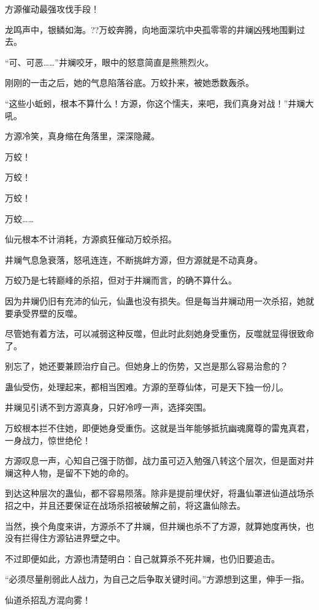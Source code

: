 
\begin{this_body}

方源催动最强攻伐手段！

龙鸣声中，银鳞如海。??万蛟奔腾，向地面深坑中央孤零零的井斓凶残地围剿过去。

“可、可恶……”井斓咬牙，眼中的怒意简直是熊熊烈火。

刚刚的一击之后，她的气息陷落谷底。万蛟扑来，被她悉数轰杀。

“这些小蚯蚓，根本不算什么！方源，你这个懦夫，来吧，我们真身对战！”井斓大吼。

方源冷笑，真身缩在角落里，深深隐藏。

万蛟！

万蛟！

万蛟！

万蛟……

仙元根本不计消耗，方源疯狂催动万蛟杀招。

井斓气息急衰落，怒吼连连，不断挑衅方源，但方源就是不动真身。

万蛟乃是七转巅峰的杀招，但对于井斓而言，的确不算什么。

因为井斓仍旧有充沛的仙元，仙蛊也没有损失。但是每当井斓动用一次杀招，她就要承受界壁的反噬。

尽管她有着方法，可以减弱这种反噬，但此时此刻她身受重伤，反噬就显得很致命了。

别忘了，她还要兼顾治疗自己。但她身上的伤势，又岂是那么容易治愈的？

蛊仙受伤，处理起来，都相当困难。方源的至尊仙体，可是天下独一份儿。

井斓见引诱不到方源真身，只好冷哼一声，选择突围。

万蛟根本拦不住她，即便她身受重伤。这就是当年能够抵抗幽魂魔尊的雷鬼真君，一身战力，惊世绝伦！

方源叹息一声，心知自己强于防御，战力虽可迈入勉强八转这个层次，但是面对井斓这种人物，是留不下她的命的。

到达这种层次的蛊仙，都不容易陨落。除非是提前埋伏好，将蛊仙罩进仙道战场杀招之中，并且还要保证在战场杀招被破解之前，将这蛊仙除去。

当然，换个角度来讲，方源杀不了井斓，但井斓也杀不了方源，就算她度再快，也没有拦得住方源钻进界壁之中。

不过即便如此，方源也清楚明白：自己就算杀不死井斓，也仍旧要追击。

“必须尽量削弱此人战力，为自己之后争取关键时间。”方源想到这里，伸手一指。

仙道杀招乱方混向雾！


\end{this_body}
